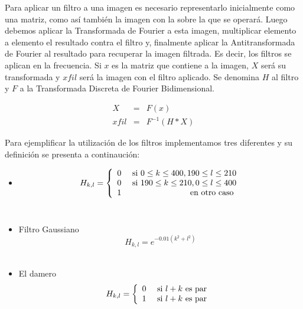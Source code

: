 \documentclass{article}
\begin{document}
\begin{multicols}{2}
\par Para aplicar un filtro a una imagen es necesario representarlo inicialmente como una matriz, como así también la imagen con la sobre la que se operará. Luego debemos aplicar la Transformada de Fourier a esta imagen, multiplicar elemento a elemento el resultado contra el filtro y, finalmente aplicar la Antitransformada de Fourier al resultado para recuperar la imagen filtrada. Es decir, los filtros se aplican en la frecuencia. Si $x$ es la matriz que contiene a la imagen, $X$ será su transformada y $xfil$ será la imagen con el filtro aplicado. Se denomina $H$ al filtro y $F$ a la Transformada Discreta de Fourier Bidimensional.

\begin{eqnarray*}
    X &=& F(x)\\
    xfil &=& F^{-1}(H * X)
\end{eqnarray*}

\par Para ejemplificar la utilización de los filtros implementamos tres diferentes y su definición se presenta a continaución:

\begin{itemize}
    \item \begin{equation} H_{k,l} = \left\{ \begin{array}{lr}
                                0 & \textnormal{ si } 0 \le k \le 400, 190 \le l \le 210\\
                                0 & \textnormal{ si } 190 \le k \le 210, 0 \le l \le 400\\
                                1 & \textnormal { en otro caso }
                               \end{array}
              \right. 
          \end{equation}\\
    \item Filtro Gaussiano \begin{equation} H_{k,l} = e^{ -0.01 (k^2 + l^2)} \end{equation}\\
    \item El damero \begin{equation} H_{k,l} = \left\{ \begin{array}{lr}
                                0 & \textnormal{ si } l + k \textnormal{ es par }\\
                                1 & \textnormal{ si } l + k \textnormal{ es par }
                               \end{array}
              \right. 
          \end{equation}
\end{itemize}


\end{multicols}
\end{document}
